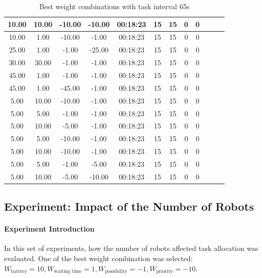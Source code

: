 \begin{table}[htb]
{\begin{tabular}{|c|c|c|c|c|c|c|c|c|c|c|c|}
10.00   & 10.00    & -10.00  & -10.00  & 00:18:23 & 15    & 15  & 0  & 0    \\ \hline
10.00   & 1.00     & -10.00  & -1.00   & 00:18:23 & 15    & 15  & 0  & 0    \\ \hline
25.00   & 1.00     & -1.00   & -25.00  & 00:18:23 & 15    & 15  & 0  & 0    \\ \hline
30.00   & 30.00    & -1.00   & -1.00   & 00:18:23 & 15    & 15  & 0  & 0    \\ \hline
45.00   & 1.00     & -1.00   & -1.00   & 00:18:23 & 15    & 15  & 0  & 0    \\ \hline
45.00   & 1.00     & -45.00  & -1.00   & 00:18:23 & 15    & 15  & 0  & 0    \\ \hline
5.00    & 10.00    & -10.00  & -1.00   & 00:18:23 & 15    & 15  & 0  & 0    \\ \hline
5.00    & 5.00     & -1.00   & -1.00   & 00:18:23 & 15    & 15  & 0  & 0   \\ \hline
5.00    & 10.00    & -5.00   & -1.00   & 00:18:23 & 15    & 15  & 0  & 0    \\ \hline
5.00    & 5.00     & -10.00  & -1.00   & 00:18:23 & 15    & 15  & 0  & 0   \\ \hline
5.00    & 10.00    & -10.00  & -1.00   & 00:18:23 & 15    & 15  & 0  & 0    \\ \hline
5.00    & 5.00     & -1.00   & -5.00   & 00:18:23 & 15    & 15  & 0  & 0    \\ \hline
5.00    & 10.00    & -5.00   & -10.00  & 00:18:23 & 15    & 15  & 0  & 0    \\ \hline
\end{tabular}}
\caption{Best weight combinations with task interval 65s}
\label{tab:exp_task_65s}
\end{table}


\subsection{Experiment: Impact of the Number of Robots}

\paragraph{Experiment Introduction} 
In this set of experiments, how the number of robots affected task allocation was evaluated. One of the best weight combination was selected: $ W_{\mbox{battery}} = 10,W_{\mbox{waiting time}} = 1,  W_{\mbox{possibility}} = -1, W_{\mbox{priority}} = -10 $. 
    
